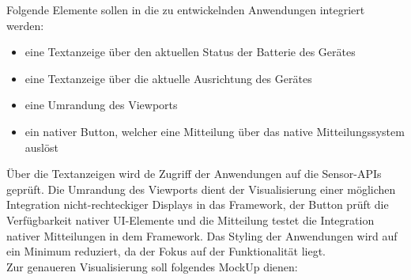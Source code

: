 \documentclass[a4paper]{scrartcl}
\begin{document}
Folgende Elemente sollen in die zu entwickelnden Anwendungen integriert werden:

\begin{itemize}
	\item eine Textanzeige über den aktuellen Status der Batterie des Gerätes
	\item eine Textanzeige über die aktuelle Ausrichtung des Gerätes
	\item eine Umrandung des Viewports
	\item ein nativer Button, welcher eine Mitteilung über das native Mitteilungssystem auslöst 
\end{itemize}

Über die Textanzeigen wird de Zugriff der Anwendungen auf die Sensor-APIs geprüft. Die Umrandung des Viewports dient der Visualisierung einer möglichen Integration nicht-rechteckiger Displays in das Framework, der Button prüft die Verfügbarkeit nativer UI-Elemente und die Mitteilung testet die Integration nativer Mitteilungen in dem Framework. Das Styling der Anwendungen wird auf ein Minimum reduziert, da der Fokus auf der Funktionalität liegt. \\
Zur genaueren Visualisierung soll folgendes MockUp dienen:
\end{document}
